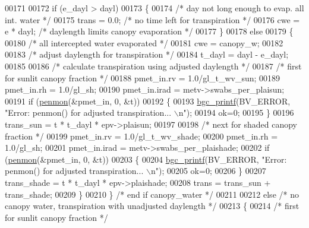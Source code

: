 \begin{DoxyCode}
00171         
00172         \textcolor{keywordflow}{if} (e\_dayl > dayl)  
00173         \{
00174             \textcolor{comment}{/* day not long enough to evap. all int. water */}
00175             trans = 0.0;    \textcolor{comment}{/* no time left for transpiration */}
00176             cwe = e * dayl;   \textcolor{comment}{/* daylength limits canopy evaporation */}
00177         \}
00178         \textcolor{keywordflow}{else}                
00179         \{
00180             \textcolor{comment}{/* all intercepted water evaporated */}
00181             cwe = canopy\_w;
00182             
00183             \textcolor{comment}{/* adjust daylength for transpiration */}
00184             t\_dayl = dayl - e\_dayl;
00185              
00186             \textcolor{comment}{/* calculate transpiration using adjusted daylength */}
00187             \textcolor{comment}{/* first for sunlit canopy fraction */}
00188             pmet\_in.rv = 1.0/gl\_t\_wv\_sun;
00189             pmet\_in.rh = 1.0/gl\_sh;
00190             pmet\_in.irad = metv->swabs\_per\_plaisun;
00191             \textcolor{keywordflow}{if} (\hyperlink{canopy__et_8c_a5c8d396ed94c7e0f3f4c80dd3ecd046c}{penmon}(&pmet\_in, 0, &t))
00192             \{
00193                 \hyperlink{bgc__io_8c_af287cce6e2aede1ce337de9319e80d0d}{bgc\_printf}(BV\_ERROR, \textcolor{stringliteral}{"Error: penmon() for adjusted transpiration... \(\backslash\)n"});
00194                 ok=0;
00195             \}
00196             trans\_sun = t * t\_dayl * epv->plaisun;
00197             
00198             \textcolor{comment}{/* next for shaded canopy fraction */}
00199             pmet\_in.rv = 1.0/gl\_t\_wv\_shade;
00200             pmet\_in.rh = 1.0/gl\_sh;
00201             pmet\_in.irad = metv->swabs\_per\_plaishade;
00202             \textcolor{keywordflow}{if} (\hyperlink{canopy__et_8c_a5c8d396ed94c7e0f3f4c80dd3ecd046c}{penmon}(&pmet\_in, 0, &t))
00203             \{
00204                 \hyperlink{bgc__io_8c_af287cce6e2aede1ce337de9319e80d0d}{bgc\_printf}(BV\_ERROR, \textcolor{stringliteral}{"Error: penmon() for adjusted transpiration... \(\backslash\)n"});
00205                 ok=0;
00206             \}
00207             trans\_shade = t * t\_dayl * epv->plaishade;
00208             trans = trans\_sun + trans\_shade;
00209         \}
00210     \}    \textcolor{comment}{/* end if canopy\_water */}
00211     
00212     \textcolor{keywordflow}{else} \textcolor{comment}{/* no canopy water, transpiration with unadjusted daylength */}
00213     \{
00214         \textcolor{comment}{/* first for sunlit canopy fraction */}

\end{DoxyCode}
